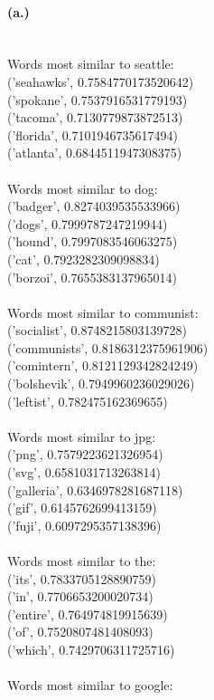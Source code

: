 \documentclass{article}
\begin{document}
\paragraph{(a.)}
\\Words most similar to seattle: 
\\('seahawks', 0.7584770173520642)
\\('spokane', 0.7537916531779193)
\\('tacoma', 0.7130779873872513)
\\('florida', 0.7101946735617494)
\\('atlanta', 0.6844511947308375)
\\\\Words most similar to dog:
\\('badger', 0.8274039535533966)
\\('dogs', 0.7999787247219944)
\\('hound', 0.7997083546063275)
\\('cat', 0.7923282309098834)
\\('borzoi', 0.7655383137965014)
\\\\Words most similar to communist:
\\('socialist', 0.8748215803139728)
\\('communists', 0.8186312375961906)
\\('comintern', 0.8121129342824249)
\\('bolshevik', 0.7949960236029026)
\\('leftist', 0.782475162369655)
\\\\Words most similar to jpg:
\\('png', 0.7579223621326954)
\\('svg', 0.6581031713263814)
\\('galleria', 0.6346978281687118)
\\('gif', 0.6145762699413159)
\\('fuji', 0.6097295357138396)
\\\\Words most similar to the:
\\('its', 0.7833705128890759)
\\('in', 0.7706653200020734)
\\('entire', 0.764974819915639)
\\('of', 0.7520807481408093)
\\('which', 0.7429706311725716)
\\\\Words most similar to google:
\end{document}
